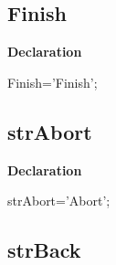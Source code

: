 \documentclass{report}
\newif\ifpdf
\begin{document}
\subsection*{Finish}
\fi
\label{trstrings-Finish}
\begin{list}{}{
\setlength{\itemindent}{0cm}
\setlength{\listparindent}{0cm}
\setlength{\leftmargin}{\evensidemargin}
\addtolength{\leftmargin}{\tmplength}
\settowidth{\labelsep}{X}
\addtolength{\leftmargin}{\labelsep}
\setlength{\labelwidth}{\tmplength}
}
\item[\textbf{Declaration}\hfill]
\ifpdf
\begin{flushleft}
\fi
\begin{ttfamily}
Finish='Finish';\end{ttfamily}

\ifpdf
\end{flushleft}
\fi

\end{list}
\ifpdf
\subsection*{\large{\textbf{strAbort}}\normalsize\hspace{1ex}\hrulefill}
\else
\subsection*{strAbort}
\fi
\label{trstrings-strAbort}
\begin{list}{}{
\setlength{\itemindent}{0cm}
\setlength{\listparindent}{0cm}
\setlength{\leftmargin}{\evensidemargin}
\addtolength{\leftmargin}{\tmplength}
\settowidth{\labelsep}{X}
\addtolength{\leftmargin}{\labelsep}
\setlength{\labelwidth}{\tmplength}
}
\item[\textbf{Declaration}\hfill]
\ifpdf
\begin{flushleft}
\fi
\begin{ttfamily}
strAbort='Abort';\end{ttfamily}

\ifpdf
\end{flushleft}
\fi

\end{list}
\ifpdf
\subsection*{\large{\textbf{strBack}}\normalsize\hspace{1ex}\hrulefill}
\else
\end{document}
